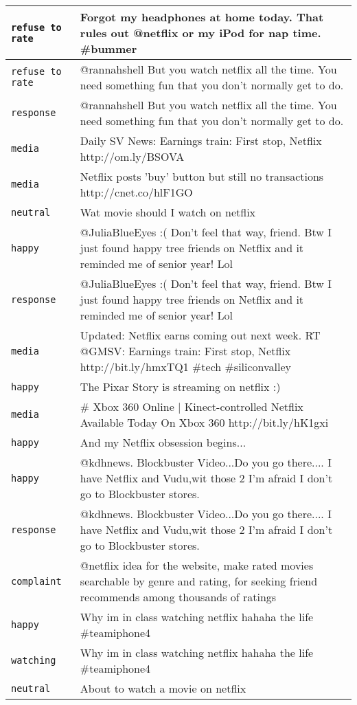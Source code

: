 \begin{center}
\begin{longtable}{|l|p{120mm}|}
      \tabularnewline\hline
         \texttt{refuse to rate} & Forgot my headphones at home today. That rules out @netflix or my iPod for nap time. \#bummer
      \tabularnewline\hline
         \texttt{refuse to rate} & @rannahshell But you watch netflix all the time. You need something fun that you don't normally get to do.
      \tabularnewline\hline
         \texttt{response} & @rannahshell But you watch netflix all the time. You need something fun that you don't normally get to do.
      \tabularnewline\hline
         \texttt{media} & Daily SV News: Earnings train: First stop, Netflix http://om.ly/BSOVA
      \tabularnewline\hline
         \texttt{media} & Netflix posts 'buy' button but still no transactions http://cnet.co/hlF1GO
      \tabularnewline\hline
         \texttt{neutral} & Wat movie should I watch on netflix
      \tabularnewline\hline
         \texttt{happy} & @JuliaBlueEyes :( Don't feel that way, friend. Btw I just found happy tree friends on Netflix and it reminded me of senior year! Lol
      \tabularnewline\hline
         \texttt{response} & @JuliaBlueEyes :( Don't feel that way, friend. Btw I just found happy tree friends on Netflix and it reminded me of senior year! Lol
      \tabularnewline\hline
         \texttt{media} & Updated: Netflix earns coming out next week. RT @GMSV: Earnings train: First stop, Netflix http://bit.ly/hmxTQ1 \#tech \#siliconvalley
      \tabularnewline\hline
         \texttt{happy} & The Pixar Story is streaming on netflix :)
      \tabularnewline\hline
         \texttt{media} & \# Xbox 360 Online | Kinect-controlled Netflix Available Today On Xbox 360 http://bit.ly/hK1gxi
      \tabularnewline\hline
         \texttt{happy} & And my Netflix obsession begins...
      \tabularnewline\hline
         \texttt{happy} & @kdhnews. Blockbuster Video...Do you go there.... I have Netflix and Vudu,wit those 2 I'm afraid I don't go to Blockbuster stores.
      \tabularnewline\hline
         \texttt{response} & @kdhnews. Blockbuster Video...Do you go there.... I have Netflix and Vudu,wit those 2 I'm afraid I don't go to Blockbuster stores.
      \tabularnewline\hline
         \texttt{complaint} & @netflix idea for the website, make rated movies searchable by genre and rating, for seeking friend recommends among thousands of ratings
      \tabularnewline\hline
         \texttt{happy} & Why im in class watching netflix hahaha the life \#teamiphone4
      \tabularnewline\hline
         \texttt{watching} & Why im in class watching netflix hahaha the life \#teamiphone4
      \tabularnewline\hline
         \texttt{neutral} & About to watch a movie on netflix

\end{longtable}
\end{center}
